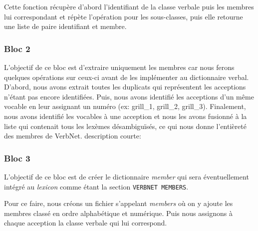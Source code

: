 Cette fonction récupère d'abord l'identifiant de la classe verbale puis les membres lui correspondant et répète l'opération pour les sous-classes, puis elle retourne une liste de paire identifiant et membre.

\subsubsection{Bloc 2}
L'objectif de ce bloc est d'extraire uniquement les membres car nous ferons quelques opérations sur ceux-ci avant de les implémenter au dictionnaire verbal. D'abord, nous avons extrait toutes les duplicats qui représentent les acceptions n'étant pas encore identifiées. Puis, nous avons identifié les acceptions d'un même vocable en leur assignant un numéro (ex: grill\_1, grill\_2, grill\_3). Finalement, nous avons identifié les vocables à une acception et nous les avons fusionné à la liste qui contenait tous les lexèmes désambiguïsés, ce qui nous donne l'entièreté des membres de VerbNet.
description courte:

\subsubsection{Bloc 3}
L'objectif de ce bloc est de créer le dictionnaire \emph{member} qui sera éventuellement intégré au \emph{lexicon} comme étant la section \texttt{VERBNET MEMBERS}.

Pour ce faire, nous créons un fichier s'appelant \emph{members} où on y ajoute les membres classé en ordre alphabétique et numérique. Puis nous assignons à chaque acception la classe verbale qui lui correspond.

